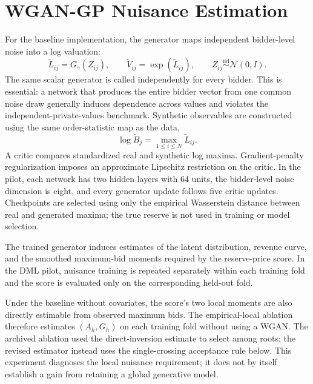 \section{WGAN-GP Nuisance Estimation}

For the baseline implementation, the generator maps independent bidder-level
noise into a log valuation:
\begin{equation}
\widetilde L_{ij}=G_{\gamma}(Z_{ij}),\qquad
\widetilde V_{ij}=\exp(\widetilde L_{ij}),
\qquad Z_{ij}\overset{\mathrm{iid}}{\sim}\mathcal N(0,I).
\end{equation}
The same scalar generator is called independently for every bidder. This is
essential: a network that produces the entire bidder vector from one common
noise draw generally induces dependence across values and violates the
independent-private-values benchmark. Synthetic observables are constructed
using the same order-statistic map as the data,
\begin{equation}
\log\widetilde B_j=\max_{1\leq i\leq N}\widetilde L_{ij}.
\end{equation}
A critic compares standardized real and synthetic log maxima. Gradient-penalty
regularization imposes an approximate Lipschitz restriction on the critic. In
the pilot, each network has two hidden layers with 64 units, the bidder-level
noise dimension is eight, and every generator update follows five critic
updates. Checkpoints are selected using only the empirical Wasserstein distance
between real and generated maxima; the true reserve is not used in training or
model selection.

The trained generator induces estimates of the latent distribution, revenue
curve, and the smoothed maximum-bid moments required by the reserve-price
score. In the DML pilot, nuisance training is repeated separately within each
training fold and the score is evaluated only on the corresponding held-out
fold.

Under the baseline without covariates, the score's two local moments are also
directly estimable from observed maximum bids. The empirical-local ablation
therefore estimates $(A_h,G_h)$ on each training fold without using a WGAN.
The archived ablation used the direct-inversion estimate to select among roots;
the revised estimator instead uses the single-crossing acceptance rule below.
This experiment diagnoses the local nuisance requirement; it does not by
itself establish a gain from retaining a global generative model.

